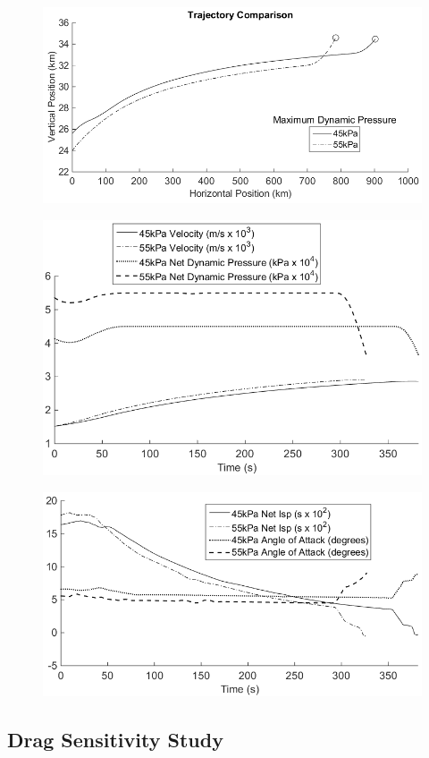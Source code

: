 \begin{figure}[ht]
\centering
\includegraphics[width=0.9\linewidth]{figures/5_Ascent/Multipleq}
\caption{}
\label{fig:Multipleq}
\end{figure}
\begin{figure}[ht]
\centering
\includegraphics[width=0.8\linewidth]{figures/5_Ascent/MultipleqAero}
\caption{}
\label{fig:MultipleqAero}
\end{figure}
\begin{figure}[ht]
\centering
\includegraphics[width=0.8\linewidth]{figures/5_Ascent/Multipleq-Vehicle}
\caption{}
\label{fig:Multipleq-Vehicle}
\end{figure}

\subsection{Drag Sensitivity Study}


